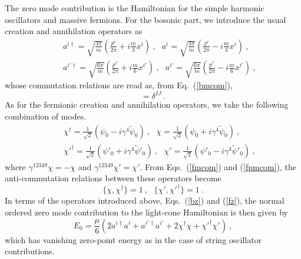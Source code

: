 \documentclass[a4paper,12pt]{article}
\numberwithin{equation}{section}
\begin{document}
The zero mode contribution is the Hamiltonian for the simple harmonic
oscillators and massive fermions.  For the bosonic part, we introduce
the usual creation and annihilation operators as
\begin{eqnarray}
& & a^{i \dagger} = \sqrt{ \frac{3 \pi}{m} }
      \left( \frac{p^i}{2 \pi} + i \frac{m}{3} x^i \right)~,
 ~~~a^i = \sqrt{ \frac{3 \pi}{m} }
      \left( \frac{p^i}{2 \pi} - i \frac{m}{3} x^i \right)~,
  \nonumber \\
& & a^{i' \dagger} = \sqrt{ \frac{6 \pi}{m} }
    \left( \frac{p^{i'}}{2 \pi} + i \frac{m}{6} x^{i'} \right)~,
 ~~~a^{i'} = \sqrt{ \frac{6 \pi}{m} }
    \left( \frac{p^{i'}}{2 \pi} - i \frac{m}{6} x^{i'} \right)~,
\label{bz}
\end{eqnarray}
whose commutation relations are read as, from Eq.~(\ref{bmcom}),
\begin{equation}
[ a^I, a^{J \dagger} ] = \delta^{IJ}~.
\end{equation}
As for the fermionic creation and annihilation operators, we take the
following combination of modes.
\begin{eqnarray}
& & \chi^\dagger = \frac{1}{\sqrt{2}}
             ( \psi_0 - i \gamma^4 \tilde{\psi}_0 )~,
 ~~~\chi = \frac{1}{\sqrt{2}}
             ( \psi_0 + i \gamma^4 \tilde{\psi}_0 )~,
  \nonumber \\
& & \chi'^\dagger = \frac{1}{\sqrt{2}}
             ( \psi'_0 + i \gamma^4 \tilde{\psi}'_0 )~,
 ~~~\chi' = \frac{1}{\sqrt{2}}
             ( \psi'_0 - i \gamma^4 \tilde{\psi}'_0 )~,
\label{fz}
\end{eqnarray}
where $\gamma^{12349} \chi = - \chi$ and $\gamma^{12349} \chi' =
\chi'$.  From Eqs.~(\ref{fmcom}) and (\ref{fpmcom}), the
anti-commutation relations between these operators become
\begin{equation}
\{ \chi, \chi^\dagger \} = 1 ~, ~~~
\{ \chi', \chi'^\dagger \} = 1 ~.
\end{equation}
In terms of the operators introduced above, Eqs.~(\ref{bz}) and
(\ref{fz}), the normal ordered zero mode contribution to the
light-cone Hamiltonian is then given by
\begin{equation}
E_0 = \frac{\mu}{6}
     ( 2 a^{i \dagger} a^i + a^{i' \dagger} a^{i'}
       + 2 \chi^\dagger \chi + \chi'^\dagger \chi' )~,
\label{zero-h}
\end{equation}
which has vanishing zero-point energy as in the case
of string oscillator contributions.
\end{document}
